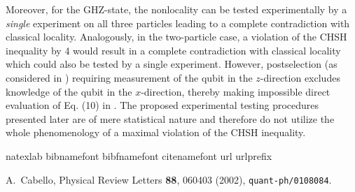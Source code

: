 Moreover, for the GHZ-state, the nonlocality can be tested experimentally
by a {\em single} experiment on all three particles
leading to a complete contradiction with classical locality.
Analogously, in the two-particle case, a violation of the CHSH inequality by 4
would result in a complete contradiction with classical locality which
could also be tested by a single experiment.
However, postselection (as considered in \cite{cabello-02a}) requiring measurement of the qubit in the $z$-direction excludes knowledge of the qubit in the $x$-direction,
thereby making impossible direct evaluation of Eq. (10) in \cite{cabello-02a}.
The proposed experimental testing procedures presented later
are of mere statistical nature and therefore do not utilize the whole phenomenology
of a maximal violation of the CHSH inequality.


%
%
%
%

\begin{thebibliography}{1}
\expandafter\ifx\csname natexlab\endcsname\relax\def\natexlab#1{#1}\fi
\expandafter\ifx\csname bibnamefont\endcsname\relax
  \def\bibnamefont#1{#1}\fi
\expandafter\ifx\csname bibfnamefont\endcsname\relax
  \def\bibfnamefont#1{#1}\fi
\expandafter\ifx\csname citenamefont\endcsname\relax
  \def\citenamefont#1{#1}\fi
\expandafter\ifx\csname url\endcsname\relax
  \def\url#1{\texttt{#1}}\fi
\expandafter\ifx\csname urlprefix\endcsname\relax\def\urlprefix{URL }\fi
\providecommand{\bibinfo}[2]{#2}
\providecommand{\eprint}[2][]{\url{#2}}

\bibitem[{\citenamefont{Cabello}(2002)}]{cabello-02a}
\bibinfo{author}{\bibfnamefont{A.}~\bibnamefont{Cabello}},
  \bibinfo{journal}{Physical Review Letters} \textbf{\bibinfo{volume}{88}},
  \bibinfo{pages}{060403} (\bibinfo{year}{2002}), \eprint{quant-ph/0108084}.

\end{thebibliography}



